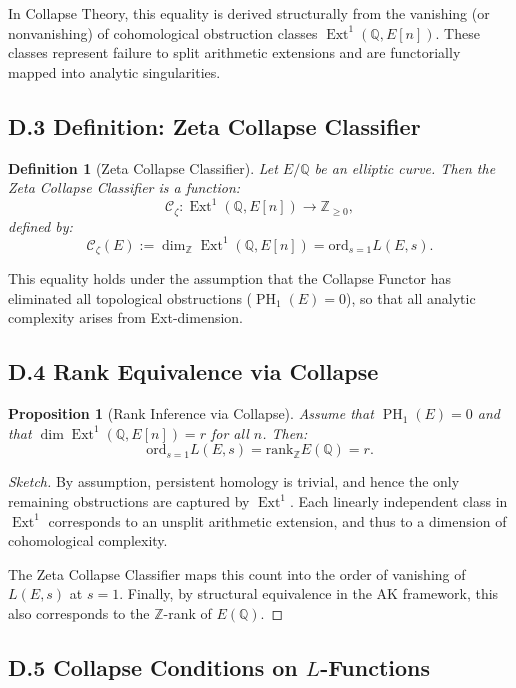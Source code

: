 \documentclass[11pt]{article}
\newtheorem{definition}[theorem]{Definition}
\newtheorem{proposition}[theorem]{Proposition}
\DeclareMathOperator{\Ext}{Ext}
\DeclareMathOperator{\PH}{PH}
\newcommand{\QQ}{\mathbb{Q}}
\newcommand{\ZZ}{\mathbb{Z}}
\begin{document}
In Collapse Theory, this equality is derived structurally from the vanishing (or nonvanishing) of cohomological obstruction classes $\Ext^1(\QQ,E[n])$.  
These classes represent failure to split arithmetic extensions and are functorially mapped into analytic singularities.

\subsection*{D.3 Definition: Zeta Collapse Classifier}

\begin{definition}[Zeta Collapse Classifier]
Let $E/\QQ$ be an elliptic curve.  
Then the Zeta Collapse Classifier is a function:
\[
\mathcal{C}_{\zeta} : \Ext^1(\QQ,E[n]) \to \mathbb{Z}_{\geq 0},
\]
defined by:
\[
\mathcal{C}_{\zeta}(E) := \dim_{\ZZ} \Ext^1(\QQ,E[n]) = \mathrm{ord}_{s=1} L(E,s).
\]
\end{definition}

This equality holds under the assumption that the Collapse Functor has eliminated all topological obstructions ($\PH_1(E) = 0$), so that all analytic complexity arises from Ext-dimension.

\subsection*{D.4 Rank Equivalence via Collapse}

\begin{proposition}[Rank Inference via Collapse]
\label{prop:zeta-rank-collapse}
Assume that $\PH_1(E) = 0$ and that $\dim \Ext^1(\QQ,E[n]) = r$ for all $n$.  
Then:
\[
\mathrm{ord}_{s=1} L(E,s) = \mathrm{rank}_{\ZZ} E(\QQ) = r.
\]
\end{proposition}

\begin{proof}[Sketch]
By assumption, persistent homology is trivial, and hence the only remaining obstructions are captured by $\Ext^1$.  
Each linearly independent class in $\Ext^1$ corresponds to an unsplit arithmetic extension, and thus to a dimension of cohomological complexity.

The Zeta Collapse Classifier maps this count into the order of vanishing of $L(E,s)$ at $s=1$.  
Finally, by structural equivalence in the AK framework, this also corresponds to the $\ZZ$-rank of $E(\QQ)$.
\end{proof}

\subsection*{D.5 Collapse Conditions on $L$-Functions}
\end{document}

